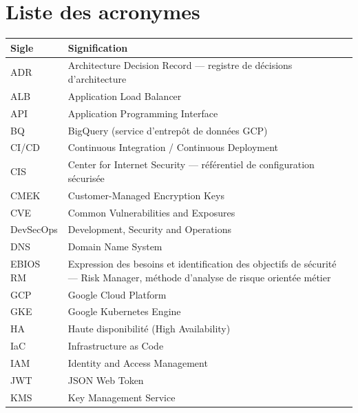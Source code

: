 \chapter*{Liste des acronymes}
\thispagestyle{plain}

\begin{longtable}{|P{3cm}|P{12.4cm}|}
\hline
\textbf{Sigle} & \textbf{Signification} \\
\hline
\endhead
ADR & Architecture Decision Record --- registre de décisions d'architecture \\ \hline
ALB & Application Load Balancer \\ \hline
API & Application Programming Interface \\ \hline
BQ & BigQuery (service d'entrepôt de données GCP) \\ \hline
CI/CD & Continuous Integration / Continuous Deployment \\ \hline
CIS & Center for Internet Security --- référentiel de configuration sécurisée \\ \hline
CMEK & Customer-Managed Encryption Keys \\ \hline
CVE & Common Vulnerabilities and Exposures \\ \hline
DevSecOps & Development, Security and Operations \\ \hline
DNS & Domain Name System \\ \hline
EBIOS RM & Expression des besoins et identification des objectifs de sécurité --- Risk Manager, méthode d'analyse de risque orientée métier \\ \hline
GCP & Google Cloud Platform \\ \hline
GKE & Google Kubernetes Engine \\ \hline
HA & Haute disponibilité (High Availability) \\ \hline
IaC & Infrastructure as Code \\ \hline
IAM & Identity and Access Management \\ \hline
JWT & JSON Web Token \\ \hline
KMS & Key Management Service \\ \hline

\end{longtable}
